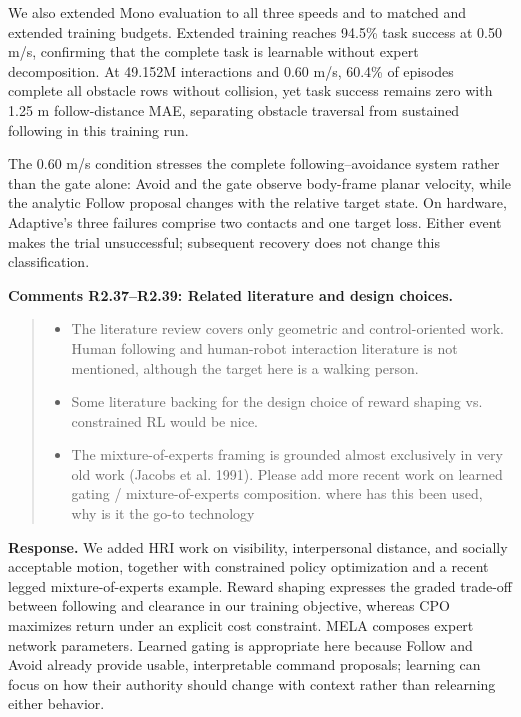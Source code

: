 \documentclass[letterpaper,11pt]{article}
\begin{document}
We also extended Mono evaluation to all three speeds and to matched and extended training budgets. Extended training reaches 94.5\% task success at 0.50 m/s, confirming that the complete task is learnable without expert decomposition. At 49.152M interactions and 0.60 m/s, 60.4\% of episodes complete all obstacle rows without collision, yet task success remains zero with 1.25 m follow-distance MAE, separating obstacle traversal from sustained following in this training run.

The 0.60 m/s condition stresses the complete following--avoidance system rather than the gate alone: Avoid and the gate observe body-frame planar velocity, while the analytic Follow proposal changes with the relative target state. On hardware, Adaptive's three failures comprise two contacts and one target loss. Either event makes the trial unsuccessful; subsequent recovery does not change this classification.
\par\nopagebreak[4]


\noindent\textbf{Comments R2.37--R2.39: Related literature and design choices.}
\begin{quote}\color{reviewgray}
\begin{itemize}[leftmargin=*,nosep,label={}]
\item[\textbf{R2.37.}] The literature review covers only geometric and control-oriented work. Human following and human-robot interaction literature is not mentioned, although the target here is a walking person.
\item[\textbf{R2.38.}] Some literature backing for the design choice of reward shaping vs. constrained RL would be nice.
\item[\textbf{R2.39.}] The mixture-of-experts framing is grounded almost exclusively in very old work (Jacobs et al. 1991). Please add more recent work on learned gating / mixture-of-experts composition. where has this been used, why is it the go-to technology
\end{itemize}
\end{quote}
\noindent\textbf{Response.}
We added HRI work on visibility, interpersonal distance, and socially acceptable motion, together with constrained policy optimization and a recent legged mixture-of-experts example. Reward shaping expresses the graded trade-off between following and clearance in our training objective, whereas CPO maximizes return under an explicit cost constraint. MELA composes expert network parameters. Learned gating is appropriate here because Follow and Avoid already provide usable, interpretable command proposals; learning can focus on how their authority should change with context rather than relearning either behavior.
\par\nopagebreak[4]
\end{document}
